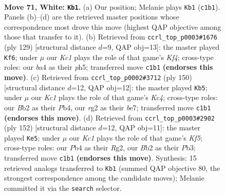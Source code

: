 \documentclass[11pt]{article}
\begin{document}
\clearpage

\begin{figure}[p]\centering
\begin{subfigure}{0.46\textwidth}\centering
\resizebox{\linewidth}{!}{%
\newchessgame
\chessboard[
  setfen={5k2/8/7R/8/bPp5/8/1B4r1/2K5 w - - 1 71},
  showmover=false,
  pgfstyle=straightmove, color=movearrow, markmove={c1-b1}
]}
\caption{}
\end{subfigure}\hfill
\begin{subfigure}{0.46\textwidth}\centering
\resizebox{\linewidth}{!}{%
\newchessgame
\chessboard[
  setfen={8/8/2R1b2p/5k1P/8/6K1/8/8 b - - 0 65},
  showmover=false,
  pgfstyle=straightmove, color=movearrow, markmove={f5-f6}
]}
\caption{}
\end{subfigure}
\\[4pt]
\begin{subfigure}{0.46\textwidth}\centering
\resizebox{\linewidth}{!}{%
\newchessgame
\chessboard[
  setfen={8/k3b3/8/8/1PK5/4p3/P3B3/8 w - - 4 76},
  showmover=false,
  pgfstyle=straightmove, color=movearrow, markmove={c4-b5}
]}
\caption{}
\end{subfigure}\hfill
\begin{subfigure}{0.46\textwidth}\centering
\resizebox{\linewidth}{!}{%
\newchessgame
\chessboard[
  setfen={8/4b2k/1r6/5K2/2B5/1P6/6R1/8 w - - 61 77},
  showmover=false,
  pgfstyle=straightmove, color=movearrow, markmove={f5-e5}
]}
\caption{}
\end{subfigure}
\caption{\textbf{Move 71, White: \texttt{Kb1}.} (a) Our position; Melanie plays \texttt{Kb1} (\texttt{c1b1}). Panels (b)--(d) are the retrieved master positions whose correspondence most drove this move (highest QAP objective among those that transfer to it). (b) Retrieved from \texttt{ccrl\_top\_p0003\#1676} (ply 129) [structural distance $d$=9, QAP obj=13]: the master played \texttt{Kf6}; under $\mu$ our \emph{Kc1} plays the role of that game's \emph{Kf4}; cross-type roles: our \emph{b}a4 as their \emph{p}h5; transferred move \texttt{c1b1} \textbf{(endorses this move)}. (c) Retrieved from \texttt{ccrl\_top\_p0002\#3712} (ply 150) [structural distance $d$=12, QAP obj=12]: the master played \texttt{Kb5}; under $\mu$ our \emph{Kc1} plays the role of that game's \emph{Kc4}; cross-type roles: our \emph{B}b2 as their \emph{P}b4, our \emph{r}g2 as their \emph{b}e7; transferred move \texttt{c1b1} \textbf{(endorses this move)}. (d) Retrieved from \texttt{ccrl\_top\_p0003\#2902} (ply 152) [structural distance $d$=12, QAP obj=11]: the master played \texttt{Ke5}; under $\mu$ our \emph{Kc1} plays the role of that game's \emph{Kf5}; cross-type roles: our \emph{P}b4 as their \emph{R}g2, our \emph{B}b2 as their \emph{P}b3; transferred move \texttt{c1b1} \textbf{(endorses this move)}. Synthesis: 15 retrieved analogs transferred to \texttt{Kb1} (summed QAP objective 80, the strongest correspondence among the candidate moves); Melanie committed it via the \texttt{search} selector.}
\label{fig:thought-m140}
\end{figure}
\end{document}
